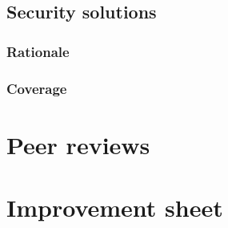\documentclass[10pt]{article}
\begin{document}
    \subsection{Security solutions}

      \subsubsection{Rationale}

      \subsubsection{Coverage}
        

  \section{Peer reviews}

  \section{Improvement sheet}
\end{document}
